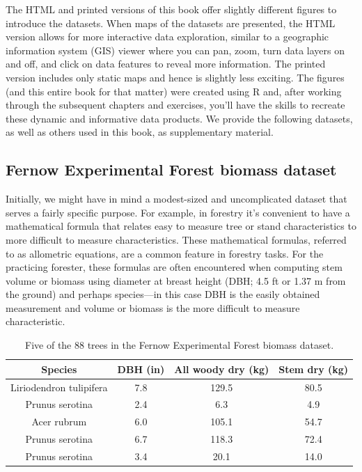 \documentclass[
  11pt,
]{krantz}
\theoremstyle{definition}
\theoremstyle{definition}
\theoremstyle{definition}
\theoremstyle{definition}
\theoremstyle{remark}
\begin{document}
The HTML and printed versions of this book offer slightly different figures to introduce the datasets. When maps of the datasets are presented, the HTML version allows for more interactive data exploration, similar to a geographic information system (GIS) viewer where you can pan, zoom, turn data layers on and off, and click on data features to reveal more information. The printed version includes only static maps and hence is slightly less exciting. The figures (and this entire book for that matter) were created using R and, after working through the subsequent chapters and exercises, you'll have the skills to recreate these dynamic and informative data products. We provide the following datasets, as well as others used in this book, as supplementary material.

\hypertarget{fef}{%
\subsection{Fernow Experimental Forest biomass dataset}\label{fef}}

Initially, we might have in mind a modest-sized and uncomplicated dataset that serves a fairly specific purpose. For example, in forestry it's convenient to have a mathematical formula that relates easy to measure tree or stand characteristics to more difficult to measure characteristics. These mathematical formulas, referred to as allometric equations, are a common feature in forestry tasks. For the practicing forester, these formulas are often encountered when computing stem volume or biomass using diameter at breast height (DBH; 4.5 ft or 1.37 m from the ground) and perhaps species---in this case DBH is the easily obtained measurement and volume or biomass is the more difficult to measure characteristic.

\begin{table}

\caption{\label{tab:FEFDat}Five of the 88 trees in the Fernow Experimental Forest biomass dataset.}
\centering
\begin{tabular}[t]{cccc}
\toprule
Species & DBH (in) & All woody dry (kg) & Stem dry (kg)\\
\midrule
Liriodendron tulipifera & 7.8 & 129.5 & 80.5\\
Prunus serotina & 2.4 & 6.3 & 4.9\\
Acer rubrum & 6.0 & 105.1 & 54.7\\
Prunus serotina & 6.7 & 118.3 & 72.4\\
Prunus serotina & 3.4 & 20.1 & 14.0\\
\bottomrule
\end{tabular}
\end{table}
\end{document}
